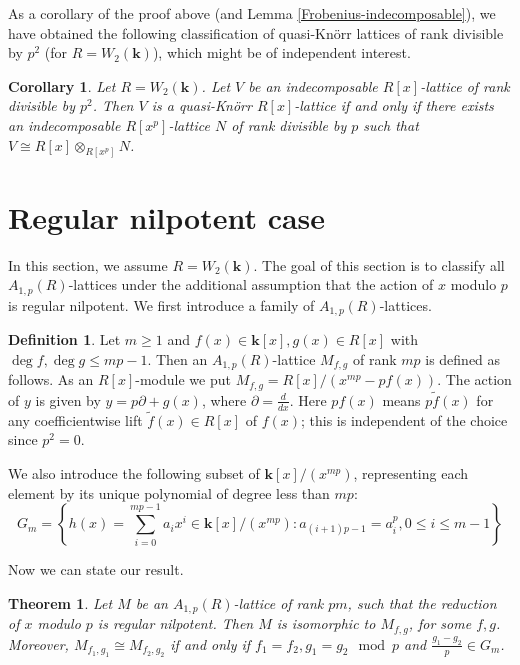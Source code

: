 \documentclass[12pt,letterpaper]{amsart}
\theoremstyle{plain}
\newtheorem{theorem}{Theorem}[section]
\newtheorem{cor}{Corollary}[section]
\theoremstyle{definition}
\newtheorem{defin}{Definition}[section]
\begin{document}
As a corollary of the proof above (and Lemma \ref{Frobenius-indecomposable}), we have obtained the following classification of quasi-Kn\"{o}rr lattices of rank divisible by $p^2$ (for $R=W_2(\mathbf{k})$),
which might be of independent interest.

\begin{cor}
Let $R=W_2(\mathbf{k})$. Let $V$ be an indecomposable $R[x]$-lattice of rank divisible by $p^2$.  Then $V$ is a quasi-Kn\"{o}rr $R[x]$-lattice
if and only if there exists an indecomposable $R[x^p]$-lattice $N$ of rank divisible by $p$ such that $V\cong R[x]\otimes_{R[x^p]}N$.

    
\end{cor}


\section{Regular nilpotent case}
In this section, we assume $R=W_2(\mathbf{k})$. 
The goal of this section is to classify all $A_{1,p}(R)$-lattices under the additional assumption that the action of $x$ modulo
$p$ is regular nilpotent. We first introduce a family of $A_{1,p}(R)$-lattices.

\begin{defin}
Let $m\geq 1$ and $f(x)\in \mathbf{k}[x], g(x)\in R[x]$ with $\deg f, \deg g\leq mp-1$. Then an $A_{1,p}(R)$-lattice $M_{f,g}$ of rank $mp$  is defined as follows. As an $R[x]$-module we put $M_{f, g}=R[x]/(x^{mp}-pf(x))$. The action of $y$ is given by $y=p\partial+g(x)$, where $\partial=\frac{d}{dx}$. Here $pf(x)$ means $p\widetilde f(x)$ for any coefficientwise lift $\widetilde f(x)\in R[x]$ of $f(x)$; this is independent of the choice since $p^2=0$.

\end{defin}

We also introduce the following subset of $\mathbf{k}[x]/(x^{mp})$, representing each element by its unique polynomial of degree less than $mp$: 
$$G_m=\left\{h(x)=\sum_{i=0}^{mp-1}a_ix^i\in \mathbf{k}[x]/(x^{mp}):a_{(i+1)p-1}=a_i^p, 0\leq i\leq m-1\right\}$$


Now we can state our result.

\begin{theorem}\label{thm:Regular}
    Let $M$ be an $A_{1,p}(R)$-lattice of rank $pm$, such that the reduction of $x$ modulo $p$ is regular nilpotent. 
    Then $M$ is isomorphic to $M_{f, g}$, for some $f, g$. Moreover, $M_{f_1, g_1}\cong M_{f_2, g_2}$ if and only if 
    $f_1=f_2, g_1=g_2\mod p$ and 
    $\frac{g_1-g_2}{p}\in G_m$.

\end{theorem}
\end{document}
